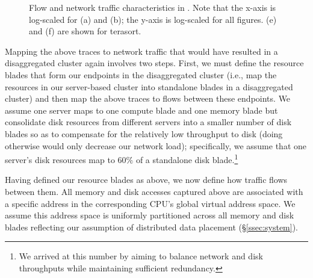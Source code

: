 \begin{figure}
{	\label{fig:fsdp}
  }
  \renewcommand{\thesubfigure}{(d)}
  \renewcommand{\thesubfigure}{(f)}
  \caption{\small{Flow and network traffic characteristics in \dis. Note that the x-axis is log-scaled for (a) and (b); the y-axis is log-scaled for all figures. (e) and (f) are shown for terasort.}}
  \label{fig:traffic}
\end{figure}
%

Mapping the above traces to network traffic that would have resulted 
in a disaggregated cluster again involves two steps. First, we must 
define the resource blades that form our endpoints in the disaggregated cluster (i.e., map the resources in our server-based cluster into standalone blades in a disaggregated cluster) and then map the above traces to flows between these endpoints. 
We assume one server maps to one compute blade and one memory blade but consolidate disk resources from different servers into a smaller number of disk blades so as to compensate for the relatively low throughput to disk (doing otherwise would only decrease our network load); specifically, we 
assume that one server's disk resources map to $60\%$ of a standalone 
disk blade.\footnote{We arrived at this number by aiming to balance network and disk throughputs while maintaining sufficient redundancy.} 

Having defined our resource blades as above, we now define how traffic 
flows between them. 
All memory and disk accesses captured above are associated with a specific address in the corresponding CPU's global virtual address space. We assume this address space is uniformly partitioned across all memory and disk blades reflecting our assumption of distributed data placement (\S\ref{ssec:system}).  


